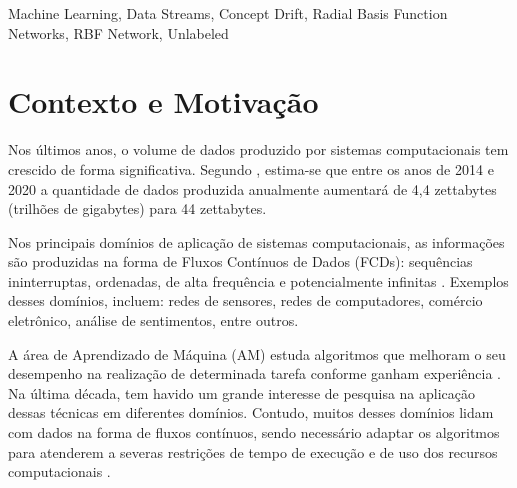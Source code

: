 \documentclass[qual, classic, a4paper]{ufbathesis}
\begin{document}
\abstract

\blindtext

\begin{keywords}
    Machine Learning, Data Streams, Concept Drift, Radial Basis Function Networks, RBF Network, Unlabeled
\end{keywords}


\tableofcontents

\listoffigures

\listoftables

\mainmatter

% 
% 
% 
%

 \label{introducao}

\section{Contexto e Motivação}

Nos últimos anos, o volume de dados produzido por sistemas computacionais tem crescido de forma significativa.
Segundo \cite{idc_report}, estima-se que entre os anos de 2014 e 2020 a quantidade de dados produzida anualmente aumentará de 4,4 zettabytes (trilhões de gigabytes) para 44 zettabytes.

Nos principais domínios de aplicação de sistemas computacionais, as informações são produzidas na forma de Fluxos Contínuos de Dados (FCDs): sequências ininterruptas, ordenadas, de alta frequência e potencialmente infinitas \cite{Aggarwal:2006:DSM:1196418}.
Exemplos desses domínios, incluem:
redes de sensores,
redes de computadores,
comércio eletrônico,
análise de sentimentos, entre outros.

A área de Aprendizado de Máquina (AM) estuda algoritmos que melhoram o seu desempenho na realização de determinada tarefa conforme ganham experiência \cite{Mitchell:1997:ML:541177}.
Na última década, tem havido um grande interesse de pesquisa na aplicação dessas técnicas em diferentes domínios.
Contudo, muitos desses domínios lidam com dados na forma de fluxos contínuos, sendo necessário adaptar os algoritmos para atenderem a severas restrições de tempo de execução e de uso dos recursos computacionais \cite{Bifet:2009:ALM:1656274.1656287}.
\end{document}
